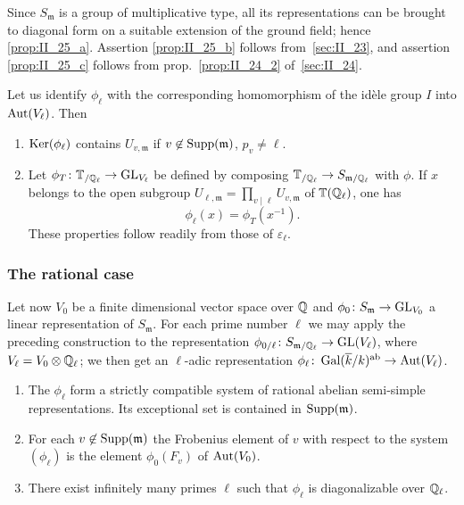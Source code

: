 Since $S_\mathfrak{m}$ is a group of multiplicative type, all its 
representations can be brought to diagonal form on a suitable extension of the 
ground field; hence \ref{prop:II_25_a}. Assertion \ref{prop:II_25_b} follows
from~\ref{sec:II_23}, and assertion \ref{prop:II_25_c} follows from
prop.~\ref{prop:II_24_2} of~\ref{sec:II_24}.

\begin{obs}
Let us identify $\phi_\ell$ with the corresponding homomorphism of the idèle 
group $I$ into $\operatorname{Aut}(V_\ell)$. Then
\begin{enumerate}[resume*=prII_25_1]
\item $\operatorname{Ker}(\phi_\ell)$ contains $U_{v , \mathfrak{m}}$ if $v \not\in 
\operatorname{Supp}(\mathfrak{m})$, $p_v \neq \ell$.
\item Let $\phi_T \colon \mathbb{T}_{/\mathbb{Q}_\ell} \to \operatorname{GL}_{V_\ell}$ be defined by 
composing $\mathbb{T}_{/\mathbb{Q}_\ell} \to S_{\mathfrak{m}/\mathbb{Q}_\ell}$ with $\phi$. If $x$ 
belongs to the open subgroup $U_{\ell , \mathfrak{m}} = \prod_{v \mid \ell} 
U_{v , \mathfrak{m}}$ of $\mathbb{T}(\mathbb{Q}_\ell)$, one has
\[
	\phi_\ell (x) = \phi_T(x^{-1}).
\]
These properties follow readily from those of $\varepsilon_\ell$.
\end{enumerate}
\end{obs}

\subsubsection{The rational case}
\label{sec:II_25_2}

Let now $V_0$ be a finite dimensional vector space over $\mathbb{Q}$ and 
$\phi_0 \colon S_\mathfrak{m} \to \operatorname{GL}_{V_0}$ a linear representation of 
$S_\mathfrak{m}$. For each prime number $\ell$ we may apply the preceding 
construction to the representation $\phi_{0/\ell} \colon S_{\mathfrak{m}/
\mathbb{Q}_{\ell}} \to \operatorname{GL}(V_\ell)$, where $V_\ell = V_0 \otimes \mathbb{Q}_\ell$; 
\dpage
we then get an $\ell$-adic representation $\phi_\ell \colon \operatorname{Gal}(\overline{k}/k)^{\mathrm{ab}} \to \operatorname{Aut} (V_\ell)$.

\begin{thm}
\begin{enumerate}[1)]
	\item The $\phi_\ell$ form a strictly compatible system of rational abelian 
	semi-simple representations. Its exceptional set is contained in $\operatorname{Supp}
	(\mathfrak{m})$.
	\item For each $v \not\in \operatorname{Supp}(\mathfrak{m})$ the Frobenius element of $v$ 
	with respect to the system $(\phi_\ell)$ is the element $\phi_0(F_v)$ 
	of $\operatorname{Aut}(V_0)$.
	\item There exist infinitely many primes $\ell$ such that $\phi_\ell$ is 
	diagonalizable over $\mathbb{Q}_\ell$.
\end{enumerate}
\end{thm}

